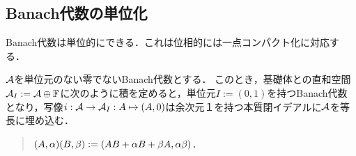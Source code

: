 \documentclass[uplatex,dvipdfmx]{jsreport}
\begin{document}
\subsection{Banach代数の単位化}

\begin{tcolorbox}[colframe=ForestGreen, colback=ForestGreen!10!white,breakable,colbacktitle=ForestGreen!40!white,coltitle=black,fonttitle=\bfseries\sffamily,
title=]
    Banach代数は単位的にできる．これは位相的には一点コンパクト化に対応する．
\end{tcolorbox}

\begin{proposition}[Banach代数の単位化]
    $\mathcal{A}$を単位元のない零でないBanach代数とする．
    このとき，基礎体との直和空間$\mathcal{A}_I:=\mathcal{A}\oplus\mathbb{F}$に次のように積を定めると，単位元$I:=(0,1)$を持つBanach代数となり，写像$i:\mathcal{A}\to\mathcal{A}_I:A\mapsto(A,0)$は余次元１を持つ本質閉イデアルに$\mathcal{A}$を等長に埋め込む．
    \begin{quote}
        $(A,\alpha)(B,\beta):=(AB+\alpha B+\beta A,\alpha\beta)$．
    \end{quote}
\end{proposition}
\end{document}
